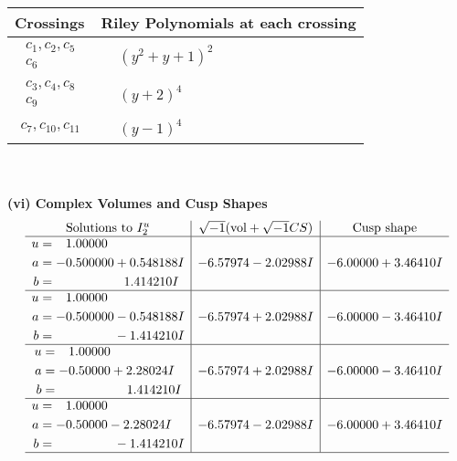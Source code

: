 \documentclass[1p]{elsarticle_modified}
\theoremstyle{definition}
\newcommand{\I}{\sqrt{-1}}
\begin{document}
\begin{tabular}{m{50pt}|m{274pt}}
Crossings & \hspace{64pt}Riley Polynomials at each crossing \\
\hline $$\begin{aligned}c_{1},c_{2},c_{5}\\c_{6}\end{aligned}$$&$\begin{aligned}
&(y^2+y+1)^2
\end{aligned}$\\
\hline $$\begin{aligned}c_{3},c_{4},c_{8}\\c_{9}\end{aligned}$$&$\begin{aligned}
&(y+2)^4
\end{aligned}$\\
\hline $$\begin{aligned}c_{7},c_{10},c_{11}\end{aligned}$$&$\begin{aligned}
&(y-1)^4
\end{aligned}$\\
\hline
\end{tabular}\\~\\
\newpage\flushleft \textbf{(vi) Complex Volumes and Cusp Shapes}
$$\begin{array}{c|c|c}  
\text{Solutions to }I^u_{2}& \I (\text{vol} + \sqrt{-1}CS) & \text{Cusp shape}\\
 \hline 
\begin{aligned}
u &= \phantom{-}1.00000\phantom{ +0.000000I} \\
a &= -0.500000 + 0.548188 I \\
b &= \phantom{-0.000000 -}1.414210 I\end{aligned}
 & -6.57974 - 2.02988 I & -6.00000 + 3.46410 I \\ \hline\begin{aligned}
u &= \phantom{-}1.00000\phantom{ +0.000000I} \\
a &= -0.500000 - 0.548188 I \\
b &= \phantom{-0.000000 } -1.414210 I\end{aligned}
 & -6.57974 + 2.02988 I & -6.00000 - 3.46410 I \\ \hline\begin{aligned}
u &= \phantom{-}1.00000\phantom{ +0.000000I} \\
a &= -0.50000 + 2.28024 I \\
b &= \phantom{-0.000000 -}1.414210 I\end{aligned}
 & -6.57974 + 2.02988 I & -6.00000 - 3.46410 I \\ \hline\begin{aligned}
u &= \phantom{-}1.00000\phantom{ +0.000000I} \\
a &= -0.50000 - 2.28024 I \\
b &= \phantom{-0.000000 } -1.414210 I\end{aligned}
 & -6.57974 - 2.02988 I & -6.00000 + 3.46410 I\\
 \hline 
 \end{array}$$\newpage\newpage\renewcommand{\arraystretch}{1}
\end{document}
